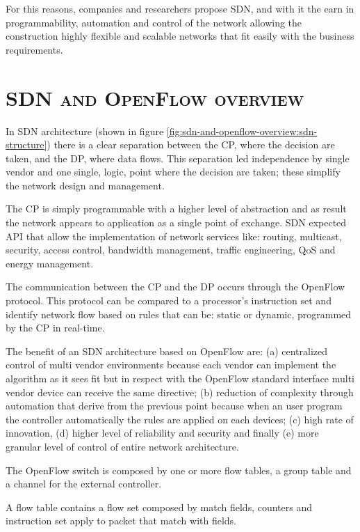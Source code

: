 For this reasons, companies and researchers propose \ac{SDN}, and with it the earn in programmability, automation and control of the network allowing the construction highly flexible and scalable networks that fit easily with the business requirements.

\section*{\small \textsc{\ac{SDN} and OpenFlow overview}}
In \ac{SDN} architecture (shown in figure \ref{fig:sdn-and-openflow-overview:sdn-structure}) there is a clear separation between the \ac{CP}, where the decision are taken, and the \ac{DP}, where data flows. This separation led independence by single vendor and one single, logic, point where the decision are taken; these simplify the network design and management.

The \ac{CP} is simply programmable with a higher level of abstraction and as result the network appears to application as a single point of exchange.
\ac{SDN} expected \ac{API} that allow the implementation of network services like: routing, multicast, security, access control, bandwidth management, traffic engineering, \ac{QoS} and energy management.

The communication between the \ac{CP} and the \ac{DP} occurs through the OpenFlow protocol. This protocol can be compared to a processor's instruction set and identify network flow based on rules that can be: static or dynamic, programmed by the \ac{CP} in real-time.

The benefit of an \ac{SDN} architecture based on OpenFlow are: (a) centralized control of multi vendor environments because each vendor can implement the algorithm as it sees fit but in respect with the OpenFlow standard interface multi vendor device can receive the same directive; (b) reduction of complexity through automation that derive from the previous point because when an user program the controller automatically the rules are applied on each devices; (c) high rate of innovation, (d) higher level of reliability and security and finally (e) more granular level of control of entire network architecture.

The OpenFlow switch is composed by one or more flow tables, a group table and a channel for the external controller.

A flow table contains a flow set composed by match fields, counters and instruction set apply to packet that match with fields.

